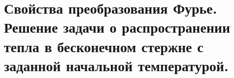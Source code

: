 \section{Свойства преобразования Фурье. Решение задачи о распространении тепла
в бесконечном стержне с заданной начальной температурой.}

\newpage
